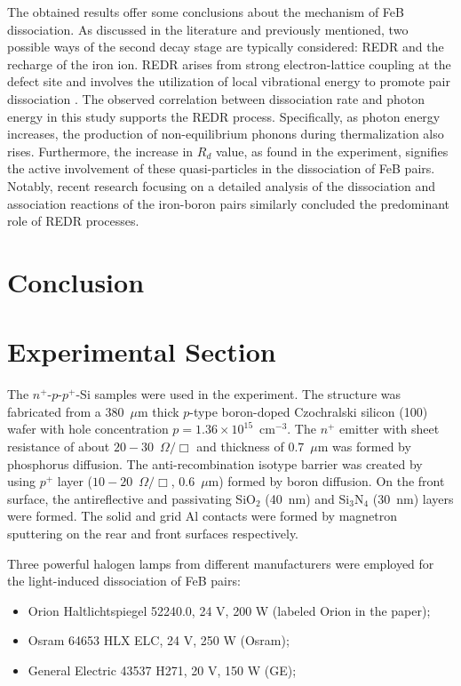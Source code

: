 \documentclass{WileyMSP-template}
\begin{document}
The obtained results offer some conclusions about the mechanism of FeB dissociation. 
As discussed in the literature and previously mentioned, two possible ways of the second decay stage 
are typically considered: REDR and the recharge of the iron ion. 
REDR arises from strong electron-lattice coupling at the defect site 
and involves the utilization of local vibrational energy to promote pair dissociation \cite{FeBAssJAP2014,Sun2021,Macdonald2004}. 
The observed correlation between dissociation rate and photon energy in this study supports the REDR process. 
Specifically, as photon energy increases, the production of non-equilibrium phonons during thermalization also rises. 
Furthermore, the increase in $R_d$ value, as found in the experiment, signifies the active involvement of these quasi-particles in the dissociation of FeB pairs. 
Notably, recent research \cite{Sun2021} focusing on a detailed analysis of the dissociation and association reactions of the iron-boron pairs similarly concluded the predominant role of REDR processes.



\section{Conclusion}\label{SecConsl}





\section{Experimental Section}
\label{SecExp}

The $n^+$-$p$-$p^+$-Si samples were used in the experiment.
The structure was fabricated from a 380~$\mu$m thick $p$-type boron-doped
Czochralski silicon (100) wafer with hole concentration $p=1.36\times10^{15}$~cm$^{-3}$.
The $n^+$ emitter with sheet resistance of about $20-30$~$\Omega/\Box$
and  thickness of $0.7$~$\mu$m was formed by phosphorus diffusion.
The anti-recombination isotype barrier was created by using $p^+$
layer ($10-20$~$\Omega/\Box$, $0.6$~$\mu$m) formed by boron diffusion.
On the front surface, the antireflective and passivating SiO$_2$ (40~nm) and Si$_3$N$_4$ (30~nm) layers
were formed.
The solid and grid Al contacts were formed by magnetron sputtering on the rear and front surfaces respectively.

Three powerful halogen lamps from different manufacturers were employed for the light-induced dissociation of FeB pairs:
\begin{itemize}
  \item Orion Haltlichtspiegel 52240.0, 24 V, 200 W (labeled Orion in the paper);
  \item Osram 64653 HLX ELC, 24 V, 250 W (Osram);
  \item General Electric 43537 H271, 20 V, 150 W (GE);
\end{itemize}
\end{document}

